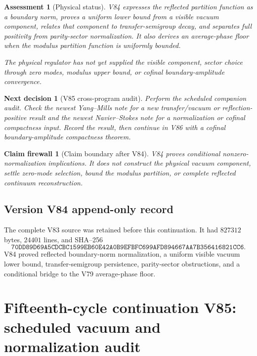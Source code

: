 \documentclass[11pt]{article}
\newtheorem{firewall}[theorem]{Claim firewall}
\newtheorem{decision}[theorem]{Next decision}
\newtheorem{assessment}[theorem]{Assessment}
\theoremstyle{remark}
\begin{document}
\begin{assessment}[Physical status]
\label{ass:v15v84-status}
V84 expresses the reflected partition function as a boundary norm,
proves a uniform lower bound from a visible vacuum component,
relates that component to transfer-semigroup decay, and separates
full positivity from parity-sector normalization.  It also derives
an average-phase floor when the modulus partition function is
uniformly bounded.

The physical regulator has not yet supplied the visible component,
sector choice through zero modes, modulus upper bound, or cofinal
boundary-amplitude convergence.
\end{assessment}

\begin{decision}[V85 cross-program audit]
\label{dec:v15v84-next}
Perform the scheduled companion audit.  Check the newest
Yang--Mills note for a new transfer/vacuum or reflection-positive
result and the newest Navier--Stokes note for a normalization or
cofinal compactness input.  Record the result, then continue in V86
with a cofinal boundary-amplitude compactness theorem.
\end{decision}

\begin{firewall}[Claim boundary after V84]
\label{fire:v15v84}
V84 proves conditional nonzero-normalization implications.  It
does not construct the physical vacuum component, settle zero-mode
selection, bound the modulus partition, or complete reflected
continuum reconstruction.
\end{firewall}

\section*{Version V84 append-only record}
The complete V83 source was retained before this continuation.  It
had \(827312\) bytes, \(24401\) lines, and SHA--256
\[
 \texttt{70DD89D69A5CDCBC1599EB60E42A0B9EFBFC699AFD894667AA7B356416821CC6}.
\]
V84 proved reflected boundary-norm normalization, a uniform visible
vacuum lower bound, transfer-semigroup persistence, parity-sector
obstructions, and a conditional bridge to the V79 average-phase
floor.

\chapter{Fifteenth-cycle continuation V85: scheduled vacuum and normalization audit}
\label{sec:v15v85}
\end{document}
